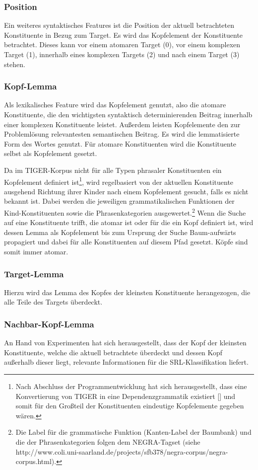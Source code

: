 \documentclass[12pt]{article}
\begin{document}
\subsubsection*{Position}
Ein weiteres syntaktisches Features ist die Position der aktuell betrachteten Konstituente in Bezug zum Target. Es wird das Kopfelement der Konstituente betrachtet. Dieses kann vor einem atomaren Target (0), vor einem komplexen Target (1), innerhalb eines komplexen Targets (2) und nach einem Target (3) stehen.
\subsubsection*{Kopf-Lemma}
Als lexikalisches Feature wird das Kopfelement genutzt, also die atomare Konstituente, die den wichtigsten syntaktisch determinierenden Beitrag innerhalb einer komplexen Konstituente leistet. Außerdem leisten Kopfelemente den zur Problemlösung relevantesten semantischen Beitrag. Es wird die lemmatisierte Form des Wortes genutzt. Für atomare Konstituenten
wird die Konstituente selbst als Kopfelement gesetzt.

Da im TIGER-Korpus nicht für alle Typen phrasaler Konstituenten ein Kopfelement definiert ist\footnote{Nach Abschluss der Programmentwicklung hat sich herausgestellt, dass eine Konvertierung von TIGER in eine Dependenzgrammatik existiert [\cite{kountz_extraktion_2006}] und somit für den Großteil der Konstituenten eindeutige Kopfelemente gegeben wären.}, wird regelbasiert von der aktuellen Konstituente ausgehend Richtung ihrer Kinder nach einem Kopfelement gesucht, falls es nicht bekannt ist. Dabei werden die jeweiligen grammatikalischen Funktionen der Kind-Konstituenten sowie die Phrasenkategorien ausgewertet.\footnote{Die Label für die grammatische Funktion (Kanten-Label der Baumbank) und die der Phrasenkategorien folgen dem NEGRA-Tagset (siehe http://www.coli.uni-saarland.de/projects/sfb378/negra-corpus/negra-corpus.html).} Wenn die Suche auf eine Konstituente trifft, die atomar ist oder für die ein Kopf definiert ist, wird dessen Lemma als Kopfelement bis zum Ursprung der Suche Baum-aufwärts propagiert und dabei für alle Konstituenten auf diesem Pfad gesetzt. Köpfe sind somit immer atomar.
\subsubsection*{Target-Lemma}
Hierzu wird das Lemma des Kopfes der kleinsten Konstituente herangezogen, die alle Teile des Targets überdeckt.
\subsubsection*{Nachbar-Kopf-Lemma}
An Hand von Experimenten hat sich herausgestellt, dass der Kopf der kleinsten Konstituente, welche die aktuell betrachtete überdeckt und dessen Kopf außerhalb dieser liegt, relevante Informationen für die SRL-Klassifikation liefert.
\end{document}
